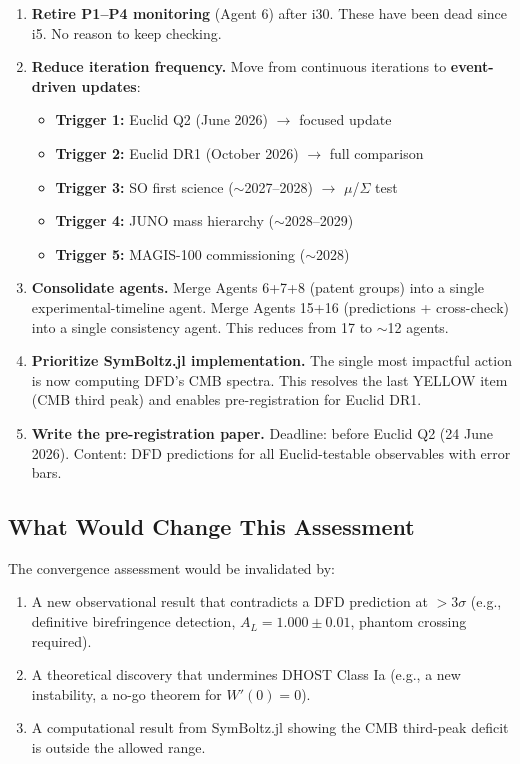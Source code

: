 \documentclass[11pt,a4paper]{article}
\begin{document}
\begin{enumerate}
\item \textbf{Retire P1--P4 monitoring} (Agent 6) after i30. These have been dead since i5. No reason to keep checking.

\item \textbf{Reduce iteration frequency.} Move from continuous iterations to \textbf{event-driven updates}:
\begin{itemize}
\item \textbf{Trigger 1:} Euclid Q2 (June 2026) $\to$ focused update
\item \textbf{Trigger 2:} Euclid DR1 (October 2026) $\to$ full comparison
\item \textbf{Trigger 3:} SO first science ($\sim$2027--2028) $\to$ $\mu$/$\Sigma$ test
\item \textbf{Trigger 4:} JUNO mass hierarchy ($\sim$2028--2029)
\item \textbf{Trigger 5:} MAGIS-100 commissioning ($\sim$2028)
\end{itemize}

\item \textbf{Consolidate agents.} Merge Agents 6+7+8 (patent groups) into a single experimental-timeline agent. Merge Agents 15+16 (predictions + cross-check) into a single consistency agent. This reduces from 17 to $\sim$12 agents.

\item \textbf{Prioritize SymBoltz.jl implementation.} The single most impactful action is now computing DFD's CMB spectra. This resolves the last YELLOW item (CMB third peak) and enables pre-registration for Euclid DR1.

\item \textbf{Write the pre-registration paper.} Deadline: before Euclid Q2 (24 June 2026). Content: DFD predictions for all Euclid-testable observables with error bars.
\end{enumerate}

\subsection{What Would Change This Assessment}

The convergence assessment would be invalidated by:
\begin{enumerate}
\item A new observational result that contradicts a DFD prediction at $>3\sigma$ (e.g., definitive birefringence detection, $A_L = 1.000 \pm 0.01$, phantom crossing required).
\item A theoretical discovery that undermines DHOST Class Ia (e.g., a new instability, a no-go theorem for $W'(0) = 0$).
\item A computational result from SymBoltz.jl showing the CMB third-peak deficit is outside the allowed range.
\end{enumerate}
\end{document}

